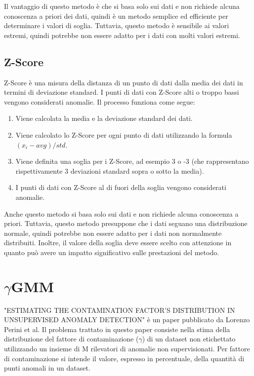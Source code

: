 Il vantaggio di questo metodo è che si basa solo sui dati e non richiede alcuna conoscenza a priori dei dati, quindi è un metodo semplice ed efficiente per determinare i valori di soglia. Tuttavia, questo metodo è sensibile ai valori estremi, quindi potrebbe non essere adatto per i dati con molti valori estremi.

\subsection{Z-Score}
Z-Score \cite{Bagdonavi_ius_2020} è una misura della distanza di un punto di dati dalla media dei dati in termini di deviazione standard. I punti di dati con Z-Score alti o troppo bassi vengono considerati anomalie.
Il processo funziona come segue:
\begin{enumerate}
\item Viene calcolata la media e la deviazione standard dei dati.
\item Viene calcolato lo Z-Score per ogni punto di dati utilizzando la formula $(x_i - avg) / std$.
\item Viene definita una soglia per i Z-Score, ad esempio 3 o -3 (che rappresentano rispettivamente 3 deviazioni standard sopra o sotto la media).
\item I punti di dati con Z-Score al di fuori della soglia vengono considerati anomalie.
\end{enumerate}
Anche questo metodo si basa solo sui dati e non richiede alcuna conoscenza a priori. Tuttavia, questo metodo presuppone che i dati seguano una distribuzione normale, quindi potrebbe non essere adatto per i dati non normalmente distribuiti. Inoltre, il valore della soglia deve essere scelto con attenzione in quanto può avere un impatto significativo sulle prestazioni del metodo.


\section{\texorpdfstring{$\gamma$}-GMM}
"ESTIMATING THE CONTAMINATION FACTOR’S DISTRIBUTION IN UNSUPERVISED ANOMALY DETECTION" \cite{https://doi.org/10.48550/arxiv.2210.10487} è un paper pubblicato da Lorenzo Perini et al.
Il problema trattato in questo paper consiste nella stima della distribuzione del fattore di contaminazione ($\gamma$) di un dataset non etichettato utilizzando un insieme di M rilevatori di anomalie non supervisionati. 
Per fattore di contaminazione si intende il valore, espresso in percentuale, della quantità di punti anomali in un dataset. 

